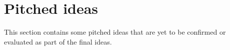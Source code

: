 \documentclass[../Main.tex]{subfiles}
\begin{document}
\section{Pitched ideas}

This section contains some pitched ideas that are yet to be confirmed or evaluated as part of the final ideas.
\end{document}
